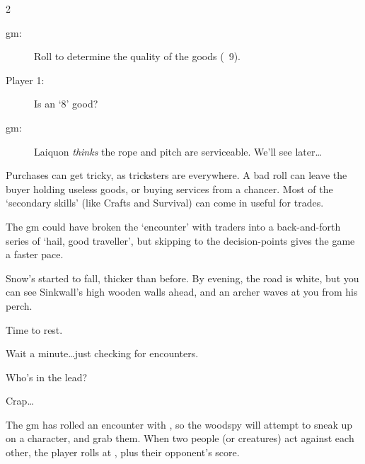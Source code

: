 \begin{multicols}{2}
\begin{description}
  \item[\Gls{gm}:] Roll  to determine the quality of the goods
  (~9).

  \item[Player 1:]  Is an `8' good?

  \item[\Gls{gm}:] Laiquon \emph{thinks} the rope and pitch are serviceable.
  We'll see later\ldots
\end{description}

\bigLine \vspace{\baselineskip}

\noindent
Purchases can get tricky, as tricksters are everywhere.  A bad roll can leave
the buyer holding useless goods, or buying services from a chancer.  Most of
the `secondary skills' (like Crafts and Survival) can come in useful for
trades.

The \gls{gm} could have broken the `encounter' with traders into a
back-and-forth series of `hail, good traveller', but skipping to the
decision-points gives the game a faster pace.


\bigLine \vspace{\baselineskip}


\begin{description}\sffamily
  \item[\Gls{gm}:] Snow's started to fall, thicker than before.  By evening,
  the road is white, but you can see Sinkwall's high wooden walls ahead, and an
  archer waves at you from his perch.

  \item[Player 1:] Time to rest.

  \item[\Gls{gm}:] Wait a minute\ldots just checking for encounters.

  \item[\Gls{gm}:] Who's in the lead?

  \item[Player 2:] Crap\ldots

\end{description}

\bigLine \vspace{\baselineskip}

\noindent
The \gls{gm} has rolled an encounter with , so the \gls{woodspy} will attempt to sneak up on a character, and grab them.
When two people (or creatures) act against each other, the player rolls at
\tn[7], plus their opponent's score.


\end{multicols}
